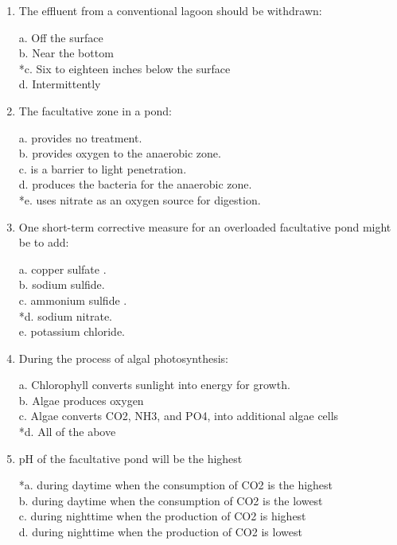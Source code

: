 \begin{enumerate}
\item  The effluent from a conventional lagoon should be withdrawn: 

a. Off the surface \\
b. Near the bottom \\
*c. Six to eighteen inches below the surface \\
d. Intermittently 


\item  The facultative zone in a pond: 

a. provides no treatment. \\
b. provides oxygen to the anaerobic zone. \\
c. is a barrier to light penetration. \\
d. produces the bacteria for the anaerobic zone. \\
*e. uses nitrate as an oxygen source for digestion. 

\item  One short-term corrective measure for an overloaded facultative pond might be to add:

a. copper sulfate . \\
b. sodium sulfide. \\
c. ammonium sulfide . \\
*d. sodium nitrate. \\
e. potassium chloride. \\



\item  During the process of algal photosynthesis:

a. Chlorophyll converts sunlight into energy for growth. \\
b. Algae produces oxygen \\
c. Algae converts CO2, NH3, and PO4, into additional algae cells \\
*d. All of the above 


\item  pH of the facultative pond will be the highest

*a. during daytime when the consumption of CO2 is the highest \\
b. during daytime when the consumption of CO2 is the lowest \\
c. during nighttime when the production of CO2 is highest \\
d. during nighttime when the production of CO2 is lowest 




\end{enumerate}